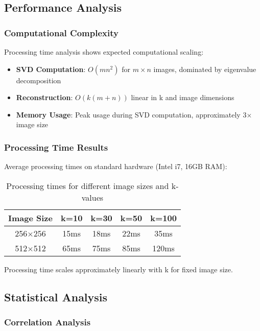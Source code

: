 \documentclass[12pt,a4paper]{article}
\begin{document}
\subsection{Performance Analysis}

\subsubsection{Computational Complexity}

Processing time analysis shows expected computational scaling:

\begin{itemize}
    \item \textbf{SVD Computation}: $O(mn^2)$ for $m \times n$ images, dominated by eigenvalue decomposition
    \item \textbf{Reconstruction}: $O(k(m+n))$ linear in k and image dimensions
    \item \textbf{Memory Usage}: Peak usage during SVD computation, approximately 3× image size
\end{itemize}

\subsubsection{Processing Time Results}

Average processing times on standard hardware (Intel i7, 16GB RAM):

\begin{table}[H]
\centering
\begin{tabular}{@{}ccccc@{}}
\toprule
Image Size & k=10 & k=30 & k=50 & k=100 \\
\midrule
256×256 & 15ms & 18ms & 22ms & 35ms \\
512×512 & 65ms & 75ms & 85ms & 120ms \\
\bottomrule
\end{tabular}
\caption{Processing times for different image sizes and k-values}
\label{tab:processing_times}
\end{table}

Processing time scales approximately linearly with k for fixed image size.

\subsection{Statistical Analysis}

\subsubsection{Correlation Analysis}
\end{document}
